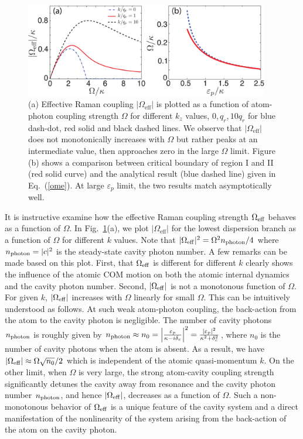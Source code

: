 \documentclass[atoms,article,submit,moreauthors,pdftex,12pt,a4paper]{mdpi}
\begin{document}
\begin{figure}[htp]
\includegraphics[width=0.95\textwidth]{fig2}\caption{(a) Effective Raman coupling $|\Omega_\text{eff}|$ is plotted as a function of atom-photon coupling strength $\Omega$ for different $k_z$ values, $0$,\,$q_r$,\,$10q_r$ for blue dash-dot, red solid and black dashed  lines. We observe that $|\Omega_\text{eff}|$ does not monotonically  increases with $\Omega$ but rather peaks at an intermediate value, then approaches zero in the large $\Omega$ limit. Figure (b) shows a comparison between critical boundary of region I and II (red solid curve) and the analytical result (blue dashed line) given in Eq.~(\ref{ome}). At large $\varepsilon_p$ limit, the two results match asymptotically well.  }\label{fig2}
\end{figure}

It is instructive examine how the effective Raman coupling strength $\Omega_{\rm eff}$ behaves as a function of $\Omega$. In Fig.~\ref{fig2}(a), we plot $|\Omega_\text{eff}|$ for the lowest dispersion branch as a function of $\Omega$ for different $k$ values. Note that $|\Omega_{\rm eff}|^2 = \Omega^2 n_{\rm photon}/4$ where $n_{\rm photon}=|c|^2$ is the steady-state cavity photon number. A few remarks can be made based on this plot. First, that $\Omega_{\rm eff}$ is different for different $k$ clearly shows the influence of the atomic COM motion on both the atomic internal dynamics and the cavity photon number. Second, $|\Omega_{\rm eff}|$ is not a monotonous function of $\Omega$. For given $k$, $|\Omega_{\rm eff}|$ increases with $\Omega$ linearly for small $\Omega$. This can be intuitively understood as follows. At such weak atom-photon coupling, the back-action from the atom to the cavity photon is negligible. The number of cavity photons $n_{\rm photon}$ is roughly given by $n_{\rm photon} \approx n_0=\left|\frac{\varepsilon_{p}}{\kappa-i\delta_{c}}\right|^2= \frac{|\varepsilon_p|^2}{\kappa^2+ \delta_c^2}$, where $n_0$ is the number of cavity photons when the atom is absent. As a result, we have $|\Omega_{\rm eff}| \approx \Omega \sqrt{n_0}/2$ which is independent of the atomic quasi-momentum $k$. On the other limit, when $\Omega$ is very large, the strong atom-cavity coupling strength significantly detunes the cavity away from resonance and the cavity photon number $n_{\rm photon}$, and hence $|\Omega_{\rm eff}|$, decreases as a function of $\Omega$. Such a non-monotonous behavior of $\Omega_{\rm eff}$ is a unique feature of the cavity system and a direct manifestation of the nonlinearity of the system arising from the back-action of the atom on the cavity photon.  
\end{document}
